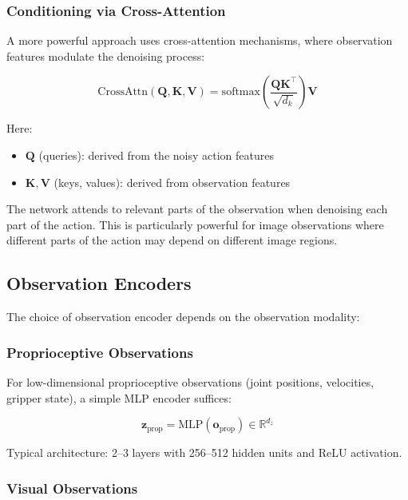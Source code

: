 \subsubsection{Conditioning via Cross-Attention}

A more powerful approach uses cross-attention mechanisms, where observation features modulate the denoising process:

\begin{equation}
\text{CrossAttn}(\mathbf{Q}, \mathbf{K}, \mathbf{V}) = \text{softmax}\left(\frac{\mathbf{Q}\mathbf{K}^\top}{\sqrt{d_k}}\right)\mathbf{V}
\label{eq:cross_attention}
\end{equation}

Here:
\begin{itemize}
    \item $\mathbf{Q}$ (queries): derived from the noisy action features
    \item $\mathbf{K}, \mathbf{V}$ (keys, values): derived from observation features
\end{itemize}

The network attends to relevant parts of the observation when denoising each part of the action. This is particularly powerful for image observations where different parts of the action may depend on different image regions.

\subsection{Observation Encoders}
\label{subsec:observation_encoders}

The choice of observation encoder depends on the observation modality:

\subsubsection{Proprioceptive Observations}

For low-dimensional proprioceptive observations (joint positions, velocities, gripper state), a simple MLP encoder suffices:

\begin{equation}
\mathbf{z}_{\text{prop}} = \text{MLP}(\mathbf{o}_{\text{prop}}) \in \mathbb{R}^{d_z}
\label{eq:prop_encoder}
\end{equation}

Typical architecture: 2--3 layers with 256--512 hidden units and ReLU activation.

\subsubsection{Visual Observations}

